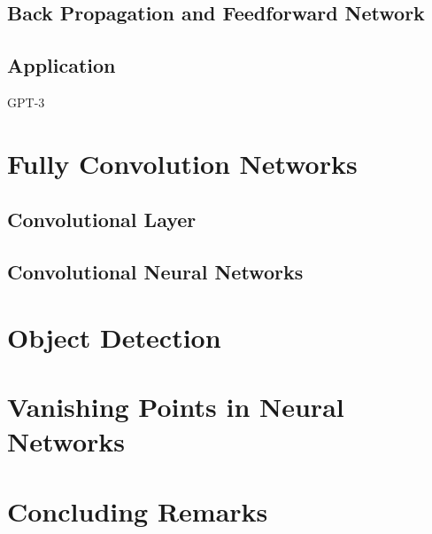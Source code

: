 \begin{spacing}{1.5}
\subsection{Back Propagation and Feedforward Network}
\label{subsec:back_propagation}

\subsection{Application}

GPT-3~\cite{brown2020language}

\section{Fully Convolution Networks}
\label{sec:LR_FCN}

\subsection{Convolutional Layer}

\subsection{Convolutional Neural Networks}

\section{Object Detection}
\label{sec:LR_objectdetection}



\section{Vanishing Points in Neural Networks}
\label{sec:LR_vpinNN}

\section{Concluding Remarks}

\end{spacing}
\newpage
